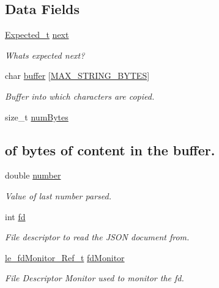 \subsection*{Data Fields}
\begin{DoxyCompactItemize}
\item 
\hyperlink{json_8c_a18cf9e31ed06ebda9ff4bb85c87f35f4}{Expected\+\_\+t} \hyperlink{struct_parser__t_ae1beff2033c683c5abf1d0ca04dc4d23}{next}
\begin{DoxyCompactList}\small\item\em What\textquotesingle{}s expected next? \end{DoxyCompactList}\item 
char \hyperlink{struct_parser__t_a73fb0aaca3e03374d6863544889bee47}{buffer} \mbox{[}\hyperlink{json_8c_acd65c385b5743f242d19b53a691d834a}{M\+A\+X\+\_\+\+S\+T\+R\+I\+N\+G\+\_\+\+B\+Y\+T\+ES}\mbox{]}
\begin{DoxyCompactList}\small\item\em Buffer into which characters are copied. \end{DoxyCompactList}\item 
size\+\_\+t \hyperlink{struct_parser__t_af94a3db94dcfdd852d1ad59230e06a15}{num\+Bytes}
\begin{DoxyCompactList}\small\item\em \subsection*{of bytes of content in the buffer.}\end{DoxyCompactList}\item 
double \hyperlink{struct_parser__t_a8eb65c92082a7c895fe5519419eb293a}{number}
\begin{DoxyCompactList}\small\item\em Value of last number parsed. \end{DoxyCompactList}\item 
int \hyperlink{struct_parser__t_a5282cf2874fbbe79f73ce6f5f2e2cda6}{fd}
\begin{DoxyCompactList}\small\item\em File descriptor to read the J\+S\+ON document from. \end{DoxyCompactList}\item 
\hyperlink{le__fd_monitor_8h_a85048556f0b95147af81e76907895d42}{le\+\_\+fd\+Monitor\+\_\+\+Ref\+\_\+t} \hyperlink{struct_parser__t_a4b75b18e2e7804554a6074e932183303}{fd\+Monitor}
\begin{DoxyCompactList}\small\item\em File Descriptor Monitor used to monitor the fd. \end{DoxyCompactList}\item 

\end{DoxyCompactItemize}
